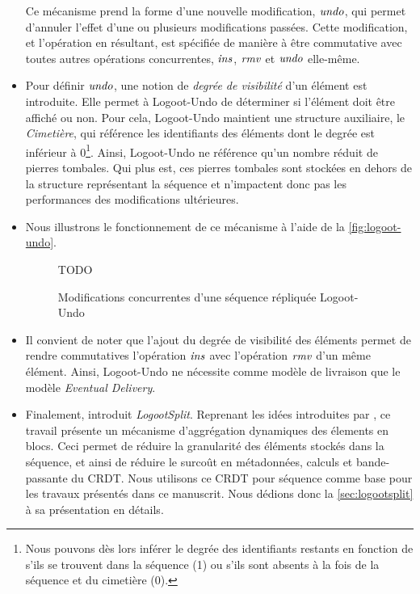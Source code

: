 \begin{itemize}
    Ce mécanisme prend la forme d'une nouvelle modification, $\mathit{undo}$, qui permet d'annuler l'effet d'une ou plusieurs modifications passées.
    Cette modification, et l'opération en résultant, est spécifiée de manière à être commutative avec toutes autres opérations concurrentes, \ie $\mathit{ins}$, $\mathit{rmv}$ et $\mathit{undo}$ elle-même.
  \item Pour définir $\mathit{undo}$, une notion de \emph{degrée de visibilité} d'un élément est introduite.
    Elle permet à Logoot-Undo de déterminer si l'élément doit être affiché ou non.
    Pour cela, Logoot-Undo maintient une structure auxiliaire, le \emph{Cimetière}, qui référence les identifiants des éléments dont le degrée est inférieur à 0\footnote{Nous pouvons dès lors inférer le degrée des identifiants restants en fonction de s'ils se trouvent dans la séquence (1) ou s'ils sont absents à la fois de la séquence et du cimetière (0).}.
    Ainsi, Logoot-Undo ne référence qu'un nombre réduit de pierres tombales.
    Qui plus est, ces pierres tombales sont stockées en dehors de la structure représentant la séquence et n'impactent donc pas les performances des modifications ultérieures.
  \item Nous illustrons le fonctionnement de ce mécanisme à l'aide de la \autoref{fig:logoot-undo}.
  \begin{figure}[!ht]

    \centering
    TODO
    \caption{Modifications concurrentes d'une séquence répliquée Logoot-Undo}
    \label{fig:logoot-undo}
  \end{figure}
  \item Il convient de noter que l'ajout du degrée de visibilité des éléments permet de rendre commutatives l'opération $\mathit{ins}$ avec l'opération $\mathit{rmv}$ d'un même élément.
    Ainsi, Logoot-Undo ne nécessite comme modèle de livraison que le modèle \emph{Eventual Delivery}.
  \item Finalement, \textcite{2013-logootsplit} introduit \emph{LogootSplit}.
    Reprenant les idées introduites par \cite{2012-string-wise}, ce travail présente un mécanisme d'aggrégation dynamiques des élements en blocs.
    Ceci permet de réduire la granularité des éléments stockés dans la séquence, et ainsi de réduire le surcoût en métadonnées, calculs et bande-passante du \ac{CRDT}.
    Nous utilisons ce \ac{CRDT} pour séquence comme base pour les travaux présentés dans ce manuscrit.
    Nous dédions donc la \autoref{sec:logootsplit} à sa présentation en détails.
\end{itemize}
